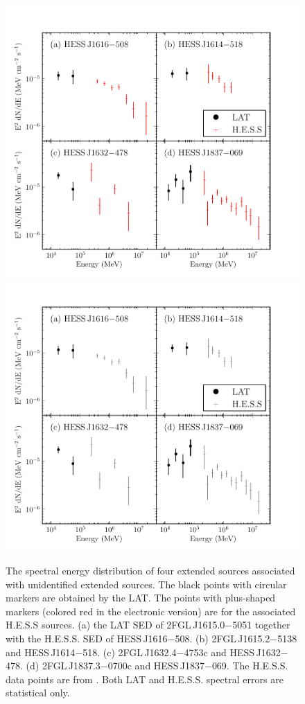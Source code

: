 \begin{figure}[htbp]
    \ifcolorfigure
      \includegraphics{summary_plots/hess_seds_color.pdf}
    \else
      \includegraphics{summary_plots/hess_seds_bw.pdf}
    \fi
    \caption{
    The spectral energy distribution of four extended
    sources associated with unidentified
    extended \tev sources.  The black points
    with circular markers are obtained by the LAT. The points with
    plus-shaped markers (colored red in the electronic version) are
    for the associated H.E.S.S sources.  (a) the
    LAT SED of 2FGL\,J1615.0$-$5051 together with the H.E.S.S. SED
    of HESS\,J1616$-$508. (b) 2FGL\,J1615.2$-$5138
    and HESS\,J1614$-$518. (c) 2FGL\,J1632.4$-$4753c
    and HESS\,J1632$-$478. (d) 2FGL\,J1837.3$-$0700c
    and HESS\,J1837$-$069. The H.E.S.S. data points are from
    \citep{aharonian_2006_h.e.s.s.-survey}. Both LAT and H.E.S.S. spectral errors are
    statistical only.}
  \end{figure}


